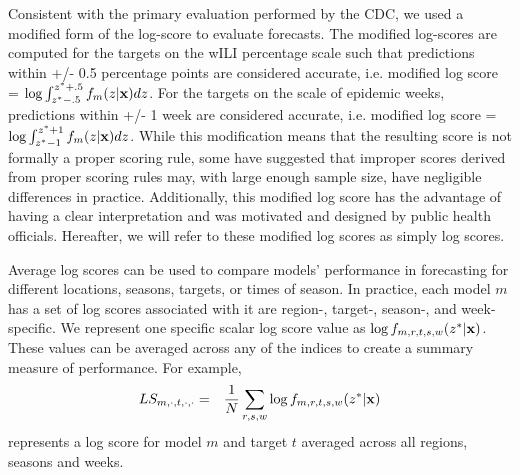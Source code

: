 \documentclass{article}\usepackage[]{graphicx}\usepackage[]{color}
\begin{document}
Consistent with the primary evaluation performed by the CDC, we used a modified form of the log-score to evaluate forecasts. 
The modified log-scores are computed for the targets on the wILI percentage scale such that predictions within +/- 0.5 percentage points are considered accurate, i.e. modified log score = $\log \int_{z^* -.5}^{z^* + .5} f_m(z|{\bf{x}})dz$. 
For the targets on the scale of epidemic weeks, predictions within +/- 1 week are considered accurate, i.e. modified log score = $\log \int_{z^* -1}^{z^* + 1} f_m(z|{\bf{x}})dz$. 
While this modification means that the resulting score is not formally a proper scoring rule, some have suggested that improper scores derived from proper scoring rules may, with large enough sample size, have negligible differences in practice.\cite{Gneiting2007} %
Additionally, this modified log score has the advantage of having a clear interpretation and was  motivated and designed by public health officials.
Hereafter, we will refer to these modified log scores as simply log scores.

Average log scores can be used to compare models' performance in forecasting for different locations, seasons, targets, or times of season.
In practice, each model $m$ has a set of log scores associated with it are region-, target-, season-, and week-specific.
We represent one specific scalar log score value as $\log f_{m,r,t,s,w}(z^*|\bf{x})$. 
These values can be averaged across any of the indices to create a summary measure of performance.
For example,
\begin{eqnarray}
LS_{m,\cdot,t,\cdot,\cdot} & = & \frac{1}{N} \sum_{r,s,w} \log f_{m,r,t,s,w}(z^*|{\bf x})
\end{eqnarray}
represents a log score for model $m$ and target $t$ averaged across all regions, seasons and weeks.
\end{document}
